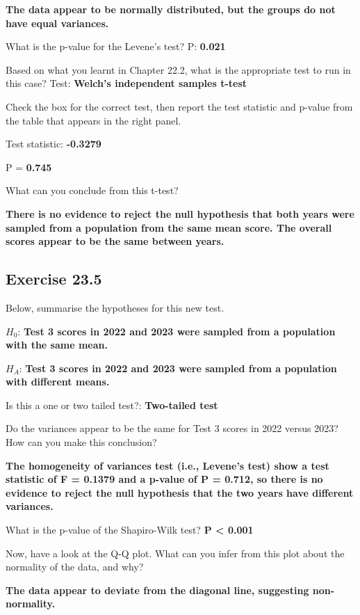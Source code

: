 \documentclass[
  openany]{scrbook}
\begin{document}
\textbf{The data appear to be normally distributed, but the groups do not have equal variances.}

What is the p-value for the Levene's test? P: \textbf{0.021}

Based on what you learnt in Chapter 22.2, what is the appropriate test to run in this case? Test: \textbf{Welch's independent samples t-test}

Check the box for the correct test, then report the test statistic and p-value from the table that appears in the right panel.

Test statistic: \textbf{-0.3279}

P = \textbf{0.745}

What can you conclude from this t-test?

\textbf{There is no evidence to reject the null hypothesis that both years were sampled from a population from the same mean score. The overall scores appear to be the same between years.}

\hypertarget{exercise-23.5}{%
\subsection{Exercise 23.5}\label{exercise-23.5}}

Below, summarise the hypotheses for this new test.

\(H_{0}\): \textbf{Test 3 scores in 2022 and 2023 were sampled from a population with the same mean.}

\(H_{A}\): \textbf{Test 3 scores in 2022 and 2023 were sampled from a population with different means.}

Is this a one or two tailed test?: \textbf{Two-tailed test}

Do the variances appear to be the same for Test 3 scores in 2022 versus 2023? How can you make this conclusion?

\textbf{The homogeneity of variances test (i.e., Levene's test) show a test statistic of F = 0.1379 and a p-value of P = 0.712, so there is no evidence to reject the null hypothesis that the two years have different variances.}

What is the p-value of the Shapiro-Wilk test? \textbf{P \textless{} 0.001}

Now, have a look at the Q-Q plot. What can you infer from this plot about the normality of the data, and why?

\textbf{The data appear to deviate from the diagonal line, suggesting non-normality.}
\end{document}
